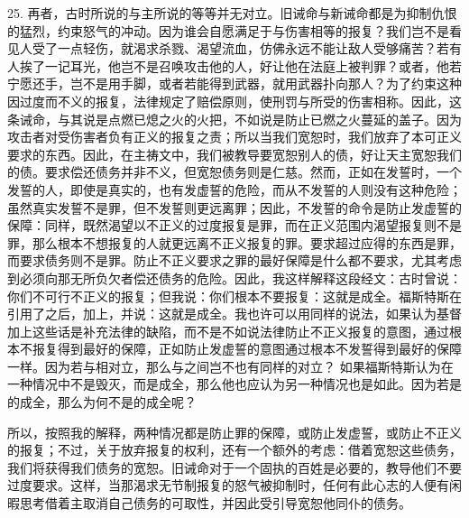 25. 再者，古时所说的与主所说的等等并无对立。旧诫命与新诫命都是为抑制仇恨的猛烈，约束怒气的冲动。因为谁会自愿满足于与伤害相等的报复？我们岂不是看见人受了一点轻伤，就渴求杀戮、渴望流血，仿佛永远不能让敌人受够痛苦？若有人挨了一记耳光，他岂不是召唤攻击他的人，好让他在法庭上被判罪？或者，他若宁愿还手，岂不是用手脚，或者若能得到武器，就用武器扑向那人？为了约束这种因过度而不义的报复，法律规定了赔偿原则，使刑罚与所受的伤害相称。因此，这条诫命，与其说是点燃已熄之火的火把，不如说是防止已燃之火蔓延的盖子。因为攻击者对受伤害者负有正义的报复之责；所以当我们宽恕时，我们放弃了本可正义要求的东西。因此，在主祷文中，我们被教导要宽恕别人的债，好让天主宽恕我们的债。要求偿还债务并非不义，但宽恕债务则是仁慈。然而，正如在发誓时，一个发誓的人，即使是真实的，也有发虚誓的危险，而从不发誓的人则没有这种危险；虽然真实发誓不是罪，但不发誓则更远离罪；因此，不发誓的命令是防止发虚誓的保障：同样，既然渴望以不正义的过度报复是罪，而在正义范围内渴望报复则不是罪，那么根本不想报复的人就更远离不正义报复的罪。要求超过应得的东西是罪，而要求债务则不是罪。防止不正义要求之罪的最好保障是什么都不要求，尤其考虑到必须向那无所负欠者偿还债务的危险。因此，我这样解释这段经文：古时曾说：你们不可行不正义的报复；但我说：你们根本不要报复：这就是成全。福斯特斯在引用了之后，加上，并说：这就是成全。我也许可以用同样的说法，如果认为基督加上这些话是补充法律的缺陷，而不是不如说法律防止不正义报复的意图，通过根本不报复得到最好的保障，正如防止发虚誓的意图通过根本不发誓得到最好的保障一样。因为若与相对立，那么与之间岂不也有同样的对立？ 如果福斯特斯认为在一种情况中不是毁灭，而是成全，那么他也应认为另一种情况也是如此。因为若是的成全，那么为何不是的成全呢？\par

所以，按照我的解释，两种情况都是防止罪的保障，或防止发虚誓，或防止不正义的报复；不过，关于放弃报复的权利，还有一个额外的考虑：借着宽恕这些债务，我们将获得我们债务的宽恕。旧诫命对于一个固执的百姓是必要的，教导他们不要过度要求。这样，当那渴求无节制报复的怒气被抑制时，任何有此心志的人便有闲暇思考借着主取消自己债务的可取性，并因此受引导宽恕他同仆的债务。\par

